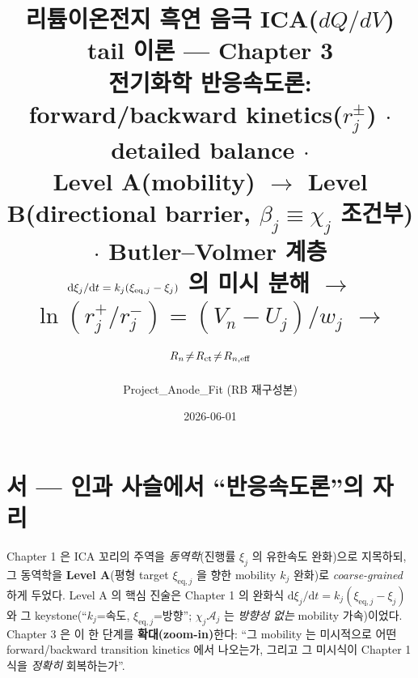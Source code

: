 \documentclass[11pt,a4paper]{article}
\title{\textbf{리튬이온전지 흑연 음극 ICA($dQ/dV$) tail 이론 — Chapter 3}\\[0.4em]
\large 전기화학 반응속도론: forward/backward kinetics($r_j^\pm$) $\cdot$ detailed balance $\cdot$\\
Level A(mobility) $\to$ Level B(directional barrier, $\beta_j\equiv\chi_j$ 조건부) $\cdot$ Butler--Volmer 계층\\[0.2em]
\normalsize $\dd\xi_j/\dd t=k_j(\xi_{\eq,j}-\xi_j)$ 의 미시 분해 $\to$ $\ln(r_j^+/r_j^-)=(V_n-U_j)/w_j$ $\to$ $R_n\!\ne\!R_{\mathrm{ct}}\!\ne\!R_{n,\mathrm{eff}}$}
\author{Project\_Anode\_Fit (RB 재구성본)}
\date{2026-06-01}
\newcommand{\dd}{\mathrm{d}}
\newcommand{\eq}{\mathrm{eq}}
\begin{document}
\sloppy
\maketitle

\section*{서 — 인과 사슬에서 ``반응속도론''의 자리}
Chapter 1 은 ICA 꼬리의 주역을 \emph{동역학}(진행률 $\xi_j$ 의 유한속도 완화)으로 지목하되, 그 동역학을
\textbf{Level A}(평형 target $\xi_{\eq,j}$ 을 향한 mobility $k_j$ 완화)로 \emph{coarse-grained} 하게 두었다.
Level A 의 핵심 진술은 Chapter 1 의 완화식 $\dd\xi_j/\dd t=k_j(\xi_{\eq,j}-\xi_j)$ 와 그 keystone(``$k_j$=속도,
$\xi_{\eq,j}$=방향''; $\chi_j\mathcal A_j$ 는 \emph{방향성 없는} mobility 가속)이었다. Chapter 3 은 이 한 단계를
\textbf{확대(zoom-in)}한다: ``그 mobility 는 미시적으로 어떤 forward/backward transition kinetics 에서
나오는가, 그리고 그 미시식이 Chapter 1 식을 \emph{정확히} 회복하는가''.
\end{document}
